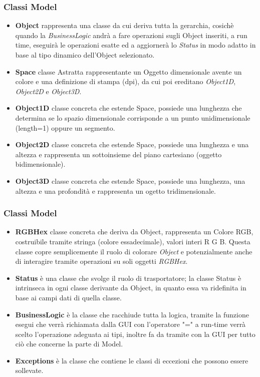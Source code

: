 \documentclass[10pt]{beamer}
\begin{document}

\begin{frame}
\frametitle{Classi Model}
\begin{itemize}
\item \textbf{Object} rappresenta una classe da cui deriva tutta la gerarchia, cosichè quando la \textit{BusinessLogic} andrà a fare operazioni sugli Object inseriti, a run time, eseguirà le operazioni esatte ed a aggiornerà lo \textit{Status} in modo adatto in base al tipo dinamico dell'Object selezionato.
\item \textbf{Space} classe Astratta rappresentante un Oggetto dimensionale avente un colore e una definizione di stampa (dpi), da cui poi ereditano \textit{Object1D}, \textit{Object2D} e \textit{Object3D}.
\item \textbf{Object1D} classe concreta che estende Space, possiede una lunghezza che determina se lo spazio dimensionale corrisponde a un punto unidimensionale (length=1) oppure un segmento.
\item \textbf{Object2D} classe concreta che estende Space, possiede una lunghezza e una altezza e rappresenta un sottoinsieme del piano cartesiano (oggetto bidimensionale).
\item \textbf{Object3D} classe concreta che estende Space, possiede una lunghezza, una altezza e una profondità e rappresenta un ogetto tridimensionale. 



\end{itemize}

\end{frame}


\begin{frame}
\frametitle{Classi Model}
\begin{itemize}
\item \textbf{RGBHex} classe concreta che deriva da Object, rappresenta un Colore RGB, costruibile tramite stringa (colore essadecimale), valori interi R G B.
Questa classe copre semplicemente il ruolo di colorare \textit{Object} e potenzialmente anche di interagire tramite operazioni su soli oggetti \textit{RGBHex}.

\item \textbf{Status} è una classe che svolge il ruolo di trasportatore; la classe Status è intrinseca in ogni classe derivante da Object, in quanto essa va ridefinita in base ai campi dati di quella classe. 

\item \textbf{BusinessLogic} è la classe che racchiude tutta la logica, tramite la funzione esegui che verrà richiamata dalla GUI con l'operatore "=" a run-time verrà scelto l'operazione adeguata ai tipi, inoltre fa da tramite con la GUI per tutto ciò che concerne la parte di Model.
\item \textbf{Exceptions} è la classe che contiene le classi di eccezioni che possono essere sollevate.
\end{itemize}
\end{frame}
\end{document}

